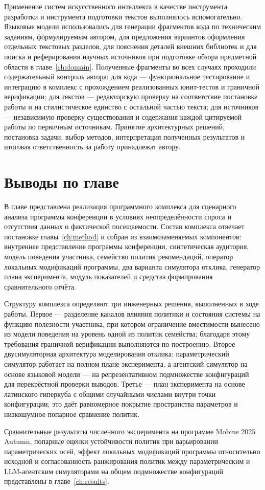 Применение систем искусственного интеллекта в качестве инструмента разработки и инструмента подготовки текстов выполнялось вспомогательно. Языковые модели использовались для генерации фрагментов кода по техническим заданиям, формулируемым автором, для предложения вариантов оформления отдельных текстовых разделов, для пояснения деталей внешних библиотек и для поиска и реферирования научных источников при подготовке обзора предметной области в главе~\ref{ch:domain}. Полученные фрагменты во всех случаях проходили содержательный контроль автора: для кода --- функциональное тестирование и интеграцию в комплекс с прохождением реализованных юнит-тестов и граничной верификации; для текстов --- редакторскую проверку на соответствие постановке работы и на стилистическое единство с остальной частью текста; для источников --- независимую проверку существования и содержания каждой цитируемой работы по первичным источникам. Принятие архитектурных решений, постановка задачи, выбор методов, интерпретация полученных результатов и итоговая ответственность за работу принадлежат автору.


\section{Выводы по главе}
\label{sec:3-9}

В главе представлена реализация программного комплекса для сценарного анализа программы конференции в условиях неопределённости спроса и отсутствия данных о фактической посещаемости. Состав комплекса отвечает постановке главы~\ref{ch:method} и собран из взаимозаменяемых компонентов: внутреннее представление программы конференции, синтетическая аудитория, модель поведения участника, семейство политик рекомендаций, оператор локальных модификаций программы, два варианта симулятора отклика, генератор плана эксперимента, модуль показателей и средства формирования сравнительного отчёта.

Структуру комплекса определяют три инженерных решения, выполненных в ходе работы. Первое --- разделение каналов влияния политики и состояния системы на функцию полезности участника, при котором ограничение вместимости вынесено из модели поведения на уровень одной из политик семейства; благодаря этому требования граничной верификации выполняются по построению. Второе --- двусимуляторная архитектура моделирования отклика: параметрический симулятор работает на полном плане эксперимента, а агентский симулятор на основе языковой модели --- на репрезентативном подмножестве конфигураций для перекрёстной проверки выводов. Третье --- план эксперимента на основе латинского гиперкуба с общими случайными числами внутри точки конфигурации; это даёт равномерное покрытие пространства параметров и низкошумное попарное сравнение политик.

Сравнительные результаты численного эксперимента на программе Mobius 2025 Autumn, попарные оценки устойчивости политик при варьировании параметрических осей, эффект локальных модификаций программы относительно исходной и согласованность ранжирования политик между параметрическим и LLM-агентским симуляторами на общем подмножестве конфигураций представлены в главе~\ref{ch:results}.

